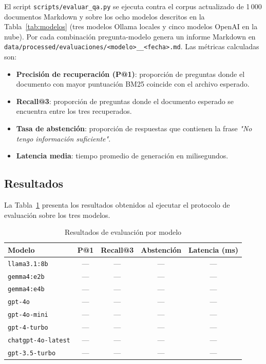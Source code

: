 \documentclass[conference]{IEEEtran}
\newcommand{\code}[1]{\texttt{\small #1}}
\begin{document}
El script \code{scripts/evaluar\_qa.py} se ejecuta contra el corpus
actualizado de 1\,000 documentos Markdown y sobre los ocho modelos
descritos en la Tabla~\ref{tab:modelos} (tres modelos Ollama locales y
cinco modelos OpenAI en la nube). Por cada combinación pregunta-modelo
genera un informe Markdown en
\code{data/processed/evaluaciones/<modelo>\_\_<fecha>.md}. Las métricas
calculadas son:

\begin{itemize}
    \item \textbf{Precisión de recuperación (P@1)}: proporción de preguntas
          donde el documento con mayor puntuación BM25 coincide con el archivo
          esperado.
    \item \textbf{Recall@3}: proporción de preguntas donde el documento
          esperado se encuentra entre los tres recuperados.
    \item \textbf{Tasa de abstención}: proporción de respuestas que contienen
          la frase \textit{"No tengo información suficiente"}.
    \item \textbf{Latencia media}: tiempo promedio de generación en
          milisegundos.
\end{itemize}

\subsection{Resultados}

La Tabla~\ref{tab:resultados} presenta los resultados obtenidos al ejecutar el
protocolo de evaluación sobre los tres modelos.

\begin{table}[ht]
\centering
\caption{Resultados de evaluación por modelo}
\label{tab:resultados}
\setlength{\tabcolsep}{3.5pt}
\begin{tabular}{@{}lcccc@{}}
\toprule
\textbf{Modelo} & \textbf{P@1} & \textbf{Recall@3}
                & \textbf{Abstención} & \textbf{Latencia (ms)} \\
\midrule
\code{llama3.1:8b}       & --- & --- & --- & --- \\
\code{gemma4:e2b}        & --- & --- & --- & --- \\
\code{gemma4:e4b}        & --- & --- & --- & --- \\
\code{gpt-4o}            & --- & --- & --- & --- \\
\code{gpt-4o-mini}       & --- & --- & --- & --- \\
\code{gpt-4-turbo}       & --- & --- & --- & --- \\
\code{chatgpt-4o-latest} & --- & --- & --- & --- \\
\code{gpt-3.5-turbo}     & --- & --- & --- & --- \\
\bottomrule
\end{tabular}
\end{table}
\end{document}
